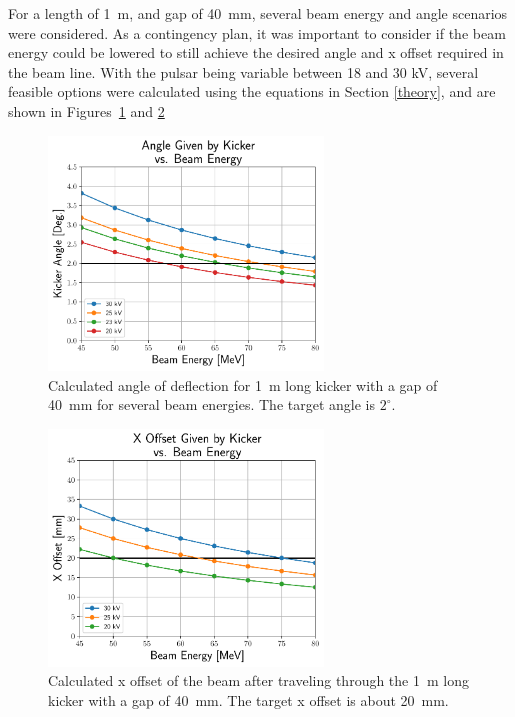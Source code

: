 For a length of \SI{1}{m}, and gap of \SI{40}{mm}, 
several beam energy and angle scenarios were considered.
As a contingency plan, it was important to consider if the 
beam energy could be lowered to still achieve the desired 
angle and x offset required in the beam line. 
With the pulsar being variable between 18 and 30 kV,
several feasible options were calculated using the equations in Section \ref{theory}, 
and are shown in Figures~\ref{fig:kickerangles} and \ref{fig:kickeroffset}
\begin{figure}%
	\begin{center}
		\includegraphics[width=0.65\textwidth]{./images/AngleVsEnergy}
		\caption{Calculated angle of deflection for \SI{1}{m} long 
		kicker with a gap of \SI{40}{mm} for several beam energies. The target angle is $2^\circ$.}
		\label{fig:kickerangles}
	\end{center}
\end{figure}
\begin{figure}%
	\begin{center}
		\includegraphics[width=0.65\textwidth]{./images/XoffsetVsEnergy}
		\caption{Calculated x offset of the beam after traveling
		through the \SI{1}{m} long kicker with a gap of \SI{40}{mm}.
		The target x offset is about \SI{20}{mm}.}
		\label{fig:kickeroffset}
	\end{center}
\end{figure}
